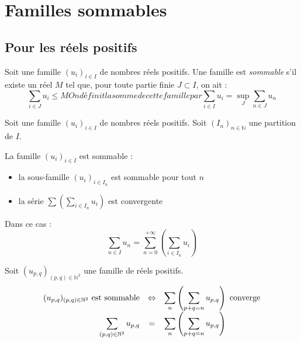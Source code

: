\documentclass[11pt,a4paper,fleqn,pdftex]{report}
\begin{document}
\section{Familles sommables} %
\label{sec:familles_sommables}
\subsection{Pour les réels positifs} %
\label{sub:pour_les_reels_positifs}
\begin{dfn}
     Soit une famille $(u_i)_{i\in I}$ de nombres réels positifs. Une famille est \emph{sommable} s'il existe un réel $M$ tel que, pour toute partie finie $J \subset I $, on ait :
     \begin{subequations}
     \begin{equation}
     \sum_{i \in J} u_i \le M
     \end{equation}
     On définit la somme de cette famille par
     \begin{equation}
     \sum_{i\in I} u_i = \sup_J \sum_{n\in J} u_n
     \end{equation}
     \end{subequations}
\end{dfn}
\begin{theorem}
     Soit une famille $(u_i)_{i\in I}$ de nombres réels positifs.\newline
     Soit $(I_n)_{n\in\mathbb{N}}$ une partition  de $I$.\par
     La famille $(u_i)_{i\in I}$ est sommable  :
     \begin{itemize}
         \item la sous-famille $(u_i)_{i\in I_n}$ est sommable pour tout $n$
         \item la série $\sum \left( \sum_{i\in I_n} u_i \right)$ est convergente
     \end{itemize}
     Dans ce cas : 
     \begin{equation}
     \sum_{n\in I} u_n = \sum_{n=0}^{+\infty} \left( \sum_{i\in I_n} u_i \right)
     \end{equation}
\end{theorem}
\begin{theorem}
     Soit $(u_{p,q})_{(p,q)\in \mathbb{N}^2}$ une famille de réels positifs.\newline
     \begin{equation}
          \begin{array}{r c l}
               (u_{p,q})_{(p,q)\in \mathbb{N}^2} \text{ est sommable} & \Leftrightarrow & \displaystyle\sum_n \left( \displaystyle\sum_{p+q = n} u_{p,q} \right)\text{ converge} \\
               \displaystyle\sum_{(p,q)\in \mathbb{N}^2} u_{p,q} & = & \displaystyle\sum_n \left( \displaystyle\sum_{p+q = n} u_{p,q} \right) \\
          \end{array}
     \end{equation}
\end{theorem}
\end{document}
